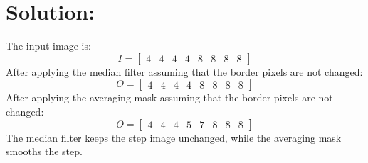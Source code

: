 \documentclass[12pt]{article}
\begin{document}
\section{Solution:}
The input image is:
\begin{equation*}
I={\left[ \begin{array}{cccccccc}
4 & 4 & 4 & 4 & 8 & 8 & 8 & 8
\end{array} \right]}
\end{equation*}
After applying the median filter assuming that the border pixels are not changed:
\begin{equation*}
O={\left[ \begin{array}{cccccccc}
4 & 4 & 4 & 4 & 8 & 8 & 8 & 8
\end{array} \right]}
\end{equation*}
After applying the averaging mask assuming that the border pixels are not changed:
\begin{equation*}
O={\left[ \begin{array}{cccccccc}
4 & 4 & 4 & 5 & 7 & 8 & 8 & 8
\end{array} \right]}
\end{equation*}
The median filter keeps the step image unchanged, while the averaging mask smooths the step.
\vfill
\clearpage
\end{document}
